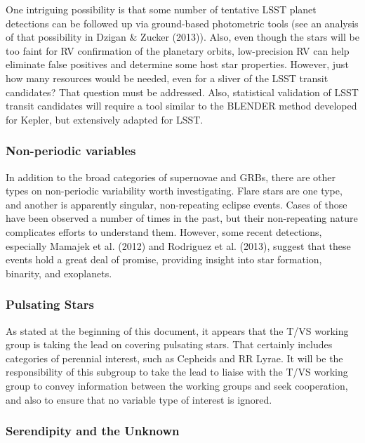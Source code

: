 One intriguing possibility is that some number of tentative LSST planet detections can be followed up via ground-based photometric tools (see an analysis of that possibility in Dzigan \& Zucker (2013)). Also, even though the stars will be too faint for RV confirmation of the planetary orbits, low-precision RV can help eliminate false positives and determine some host star properties. However, just how many resources would be needed, even for a sliver of the LSST transit candidates? That question must be addressed. Also, statistical validation of LSST transit candidates will require a tool similar to the BLENDER method developed for Kepler, but extensively adapted for LSST. 

\subsubsection{Non-periodic variables }

In addition to the broad categories of supernovae and GRBs, there are other types on non-periodic variability worth investigating. Flare stars are one type, and another is apparently singular, non-repeating 
eclipse events. Cases of those have been observed a number of times in the past, but their non-repeating nature complicates efforts to understand them. However, some recent detections, especially Mamajek et al. (2012) and Rodriguez et al. (2013), suggest that these events hold a great deal of promise, providing insight into star formation, binarity, and exoplanets. 

\subsubsection{Pulsating Stars }

As stated at the beginning of this document, it appears that the T/VS working group is taking the lead on covering pulsating stars. That certainly includes categories of perennial interest, such as Cepheids and RR Lyrae. It will be the responsibility of this subgroup to take the lead to liaise with the T/VS working group to convey information between the working groups and seek cooperation, and also to ensure that no variable type of interest is ignored. 

\subsubsection{Serendipity and the Unknown }

